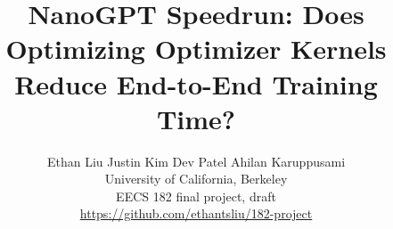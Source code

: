 \documentclass{article}
\title{NanoGPT Speedrun: Does Optimizing Optimizer Kernels Reduce End-to-End Training Time?}
\author{
Ethan Liu \qquad Justin Kim \qquad Dev Patel \qquad Ahilan Karuppusami \\
University of California, Berkeley \\
EECS 182 final project, draft \\
\url{https://github.com/ethantsliu/182-project}
}
\begin{document}
\maketitle

\end{document}
